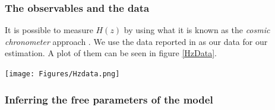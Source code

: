 \documentclass[onecolumn,           %
               showpacs,            %
               preprintnumbers,     %
               aps,                 %
               letterpaper,             %
               superscriptaddress,      %
               nofootinbib,         %
               tightenlines,        %
               floats,floatfix      %
               ,usenatbib,
               ]{revtex4-1}
\begin{document}
%

\subsubsection{The observables and the data}

It is possible to measure $H(z)$ by using what it is known as the \textit{cosmic chronometer} approach \cite{Hz}. We use the data reported in \cite{Hzdata} as our data for our estimation. A plot of them can be seen in figure \ref{HzData}.

\begin{minipage}{\textwidth}
\centering
\texttt{[image: Figures/Hzdata.png]}
\label{HzData}
\end{minipage}

\subsubsection{Inferring the free parameters of the model}
\end{document}
